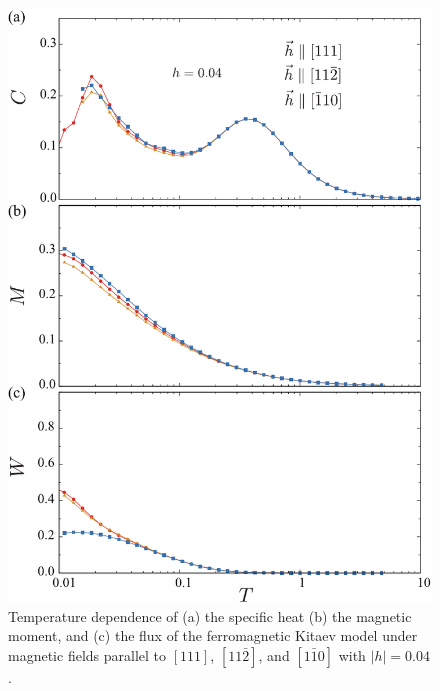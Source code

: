 \documentclass[reprint,amsmath,amssymb,aps,prx]{revtex4-2}
\begin{document}
\begin{figure}
  \begin{center}
    \includegraphics[width=0.9\linewidth]{plot_CMF_h0.04_ab.pdf}
  \end{center}
  \caption{Temperature dependence of (a) the specific heat (b) the magnetic moment, and (c) the flux of the ferromagnetic Kitaev model under magnetic fields parallel to $[111]$, $[11\bar{2}]$, and $[1\bar{1}0]$ with $|h|=0.04$.}
  \label{fig:CMF_h0.04_ab}
\end{figure}
\end{document}
